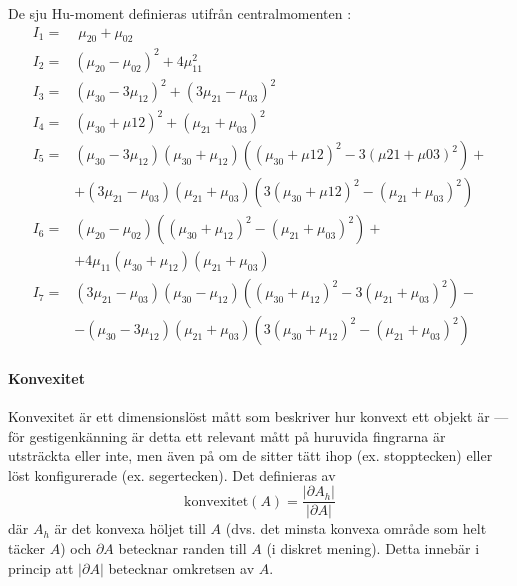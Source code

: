 \documentclass[../rapport_MVEX01-11-05]{subfiles}
\begin{document}
De sju Hu-moment definieras utifrån centralmomenten \cite[s.~185]{Hu62}:
\begin{align*}
	I_1 =& \;\mu_{20} + \mu_{02}\\
	I_2 =& \left(\mu_{20} - \mu_{02}\right)^2 + 4\mu^2_{11}\\
	I_3 =& \left(\mu_{30} - 3\mu_{12}\right)^2 +
	       \left(3\mu_{21} - \mu_{03}\right)^2\\
	I_4 =& \left(\mu_{30} + \mu{12}\right)^2 +
 	       \left(\mu_{21} + \mu_{03}\right)^2\\
	I_5 =& \left(\mu_{30} - 3\mu_{12}\right)
	       \left(\mu_{30} + \mu_{12}\right)
	       \left(\left(\mu_{30}+\mu{12}\right)^2 -
	       3\left(\mu{21}+\mu{03}\right)^2\right) + \\
 	    &+ \left(3\mu_{21} - \mu_{03}\right)\left(\mu_{21} + \mu_{03}\right)
	       \left(3\left(\mu_{30} + \mu{12}\right)^2 -
	       \left(\mu_{21} + \mu_{03}\right)^2\right)\\
	I_6 =& \left(\mu_{20}-\mu_{02}\right)
	       \left(\left(\mu_{30}+\mu_{12}\right)^2 -
	       \left(\mu_{21}+\mu_{03}\right)^2\right) + \\
	    &+ 4\mu_{11}\left(\mu_{30}+\mu_{12}\right)
	       \left(\mu_{21}+\mu_{03}\right)\\
	I_7 =& \left(3\mu_{21}-\mu_{03}\right)\left(\mu_{30}-\mu_{12}\right)
	       \left(\left(\mu_{30}+\mu_{12}\right)^2 - 
	       3\left(\mu_{21}+\mu_{03}\right)^2\right) - \\
	    &- \left(\mu_{30} - 3\mu_{12}\right)\left(\mu_{21}+\mu_{03}\right)
	       \left(3\left(\mu_{30}+\mu_{12}\right)^2 - 
  	     \left(\mu_{21}+\mu_{03}\right)^2\right)
\end{align*}



\paragraph{Konvexitet}

Konvexitet \cite[s.~26]{Rudemo09} är ett dimensionslöst
mått som beskriver hur konvext ett objekt är --- för
gestigenkänning är detta ett relevant mått på huruvida fingrarna är
utsträckta eller inte, men även på om de sitter tätt ihop (ex.
stopptecken) eller löst konfigurerade (ex. segertecken). Det
definieras av
\begin{equation*}
  \textrm{konvexitet}(A) = \frac{\left|\partial A_h\right|}{\left|\partial A\right|}
\end{equation*}
där $A_h$ är det konvexa höljet till $A$ (dvs. det minsta konvexa område som
helt täcker $A$) och $\partial A$ betecknar randen till $A$ (i diskret
mening). Detta innebär i princip att $\left|\partial A\right|$
betecknar omkretsen av $A$.
\end{document}
